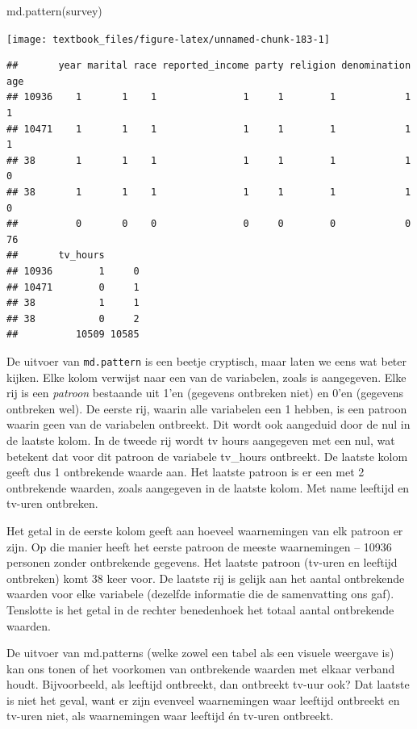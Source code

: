 \documentclass[]{tufte-book}
\newenvironment{Shaded}{}{}
\newcommand{\FunctionTok}[1]{\textcolor[rgb]{0.02,0.16,0.49}{#1}}
\newcommand{\NormalTok}[1]{#1}
\begin{document}
\begin{Shaded}
\begin{Highlighting}[]
\FunctionTok{md.pattern}\NormalTok{(survey)}
\end{Highlighting}
\end{Shaded}

\texttt{[image: textbook\_files/figure-latex/unnamed-chunk-183-1]}

\begin{verbatim}
##       year marital race reported_income party religion denomination age
## 10936    1       1    1               1     1        1            1   1
## 10471    1       1    1               1     1        1            1   1
## 38       1       1    1               1     1        1            1   0
## 38       1       1    1               1     1        1            1   0
##          0       0    0               0     0        0            0  76
##       tv_hours      
## 10936        1     0
## 10471        0     1
## 38           1     1
## 38           0     2
##          10509 10585
\end{verbatim}

De uitvoer van \texttt{md.pattern} is een beetje cryptisch, maar laten we eens wat beter kijken. Elke kolom verwijst naar een van de variabelen, zoals is aangegeven. Elke rij is een \emph{patroon} bestaande uit 1'en (gegevens ontbreken niet) en 0'en (gegevens ontbreken wel). De eerste rij, waarin alle variabelen een 1 hebben, is een patroon waarin geen van de variabelen ontbreekt. Dit wordt ook aangeduid door de nul in de laatste kolom. In de tweede rij wordt tv hours aangegeven met een nul, wat betekent dat voor dit patroon de variabele tv\_hours ontbreekt. De laatste kolom geeft dus 1 ontbrekende waarde aan. Het laatste patroon is er een met 2 ontbrekende waarden, zoals aangegeven in de laatste kolom. Met name leeftijd en tv-uren ontbreken.

Het getal in de eerste kolom geeft aan hoeveel waarnemingen van elk patroon er zijn. Op die manier heeft het eerste patroon de meeste waarnemingen -- 10936 personen zonder ontbrekende gegevens. Het laatste patroon (tv-uren en leeftijd ontbreken) komt 38 keer voor. De laatste rij is gelijk aan het aantal ontbrekende waarden voor elke variabele (dezelfde informatie die de samenvatting ons gaf). Tenslotte is het getal in de rechter benedenhoek het totaal aantal ontbrekende waarden.

De uitvoer van md.patterns (welke zowel een tabel als een visuele weergave is) kan ons tonen of het voorkomen van ontbrekende waarden met elkaar verband houdt. Bijvoorbeeld, als leeftijd ontbreekt, dan ontbreekt tv-uur ook? Dat laatste is niet het geval, want er zijn evenveel waarnemingen waar leeftijd ontbreekt en tv-uren niet, als waarnemingen waar leeftijd én tv-uren ontbreekt.
\end{document}
